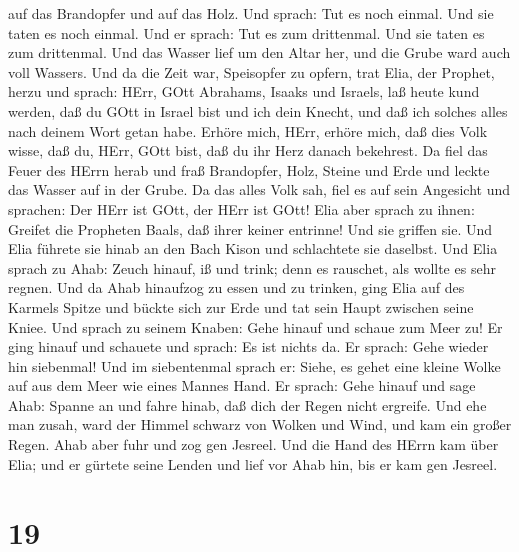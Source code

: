 auf das Brandopfer und auf das Holz. Und sprach: Tut es noch einmal. Und
sie taten es noch einmal. Und er sprach: Tut es zum drittenmal. Und sie
taten es zum drittenmal.  Und das Wasser lief um den Altar
her, und die Grube ward auch voll Wassers.  Und da die Zeit
war, Speisopfer zu opfern, trat Elia, der Prophet, herzu und sprach:
HErr, GOtt Abrahams, Isaaks und Israels, laß heute kund werden, daß du
GOtt in Israel bist und ich dein Knecht, und daß ich solches alles nach
deinem Wort getan habe.  Erhöre mich, HErr, erhöre mich,
daß dies Volk wisse, daß du, HErr, GOtt bist, daß du ihr Herz danach
bekehrest.  Da fiel das Feuer des HErrn herab und fraß
Brandopfer, Holz, Steine und Erde und leckte das Wasser auf in der
Grube.  Da das alles Volk sah, fiel es auf sein Angesicht
und sprachen: Der HErr ist GOtt, der HErr ist GOtt!  Elia
aber sprach zu ihnen: Greifet die Propheten Baals, daß ihrer keiner
entrinne! Und sie griffen sie. Und Elia führete sie hinab an den Bach
Kison und schlachtete sie daselbst.  Und Elia sprach zu
Ahab: Zeuch hinauf, iß und trink; denn es rauschet, als wollte es sehr
regnen.  Und da Ahab hinaufzog zu essen und zu trinken,
ging Elia auf des Karmels Spitze und bückte sich zur Erde und tat sein
Haupt zwischen seine Kniee.  Und sprach zu seinem Knaben:
Gehe hinauf und schaue zum Meer zu! Er ging hinauf und schauete und
sprach: Es ist nichts da. Er sprach: Gehe wieder hin siebenmal!
 Und im siebentenmal sprach er: Siehe, es gehet eine kleine
Wolke auf aus dem Meer wie eines Mannes Hand. Er sprach: Gehe hinauf und
sage Ahab: Spanne an und fahre hinab, daß dich der Regen nicht ergreife.
 Und ehe man zusah, ward der Himmel schwarz von Wolken und
Wind, und kam ein großer Regen. Ahab aber fuhr und zog gen Jesreel.
 Und die Hand des HErrn kam über Elia; und er gürtete seine
Lenden und lief vor Ahab hin, bis er kam gen Jesreel.

\hypertarget{section-18}{%
\section{19}\label{section-18}}

